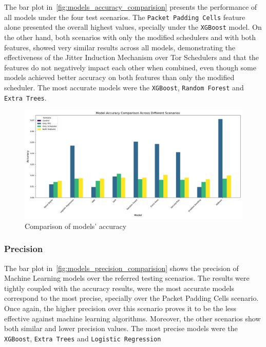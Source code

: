 The bar plot in~\autoref{fig:models_accuracy_comparision} presents the performance of all models under the four test scenarios. The \texttt{Packet Padding Cells} feature alone presented the overall highest values, specially under the \texttt{XGBoost} model. On the other hand, both scenarios with only the modified schedulers and with both features, showed very similar results across all models, demonstrating the effectiveness of the Jitter Induction Mechanism over Tor Schedulers and that the features do not negatively impact each other when combined, even though some models achieved better accuracy on both features than only the modified scheduler.
The most accurate models were the \texttt{XGBoost}, \texttt{Random Forest} and \texttt{Extra Trees}.

\begin{figure}[!h]
  \centering
  \includegraphics[width=\textwidth]{Chapters/Figures/Plots/obs_Accuracy_comparison.png}
  \caption{Comparison of models' accuracy}\label{fig:models_accuracy_comparision}
\end{figure}


\subsubsection{Precision}

The bar plot in~\autoref{fig:models_precision_comparision} shows the precision of Machine Learning models over the referred testing scenarios. The results were tightly coupled with the accuracy results, were the most accurate models correspond to the most precise, specially over the Packet Padding Cells scenario. Once again, the higher precision over this scenario proves it to be the less effective against machine learning algorithms. Moreover, the other scenarios show both similar and lower precision values.
The most precise models were the \texttt{XGBoost}, \texttt{Extra Trees} and \texttt{Logistic Regression}

